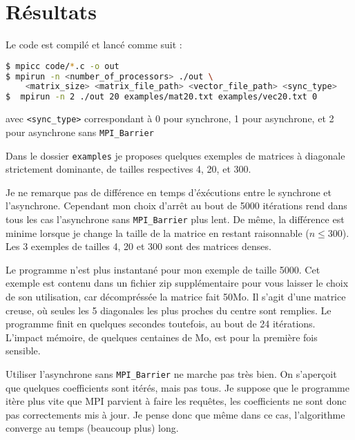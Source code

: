 \documentclass[11pt, a4paper]{article}
\begin{document}
\section{Résultats}

Le code est compilé et lancé comme suit :
\begin{lstlisting}[language=bash, keywordstyle=\color{black}\bf]
$ mpicc code/*.c -o out
$ mpirun -n <number_of_processors> ./out \
    <matrix_size> <matrix_file_path> <vector_file_path> <sync_type>
$  mpirun -n 2 ./out 20 examples/mat20.txt examples/vec20.txt 0
\end{lstlisting}

avec \lstinline{<sync_type>} correspondant à 0 pour synchrone, 1 pour asynchrone,
et 2 pour asynchrone sans \lstinline{MPI_Barrier}

\bigskip

Dans le dossier \texttt{examples} je proposes quelques exemples de matrices à diagonale strictement dominante, de tailles respectives 4, 20, et 300.

Je ne remarque pas de différence en temps d'éxécutions entre le synchrone et l'asynchrone. Cependant mon choix d'arrêt au bout de 5000 itérations rend dans tous les cas l'asynchrone sans \lstinline{MPI_Barrier} plus lent.
De même, la différence est minime lorsque je change la taille de la matrice en restant raisonnable (\(n \leq 300\)).
Les 3 exemples de tailles 4, 20 et 300 sont des matrices denses.

Le programme n'est plus instantané pour mon exemple de taille 5000.
Cet exemple est contenu dans un fichier zip supplémentaire pour vous laisser le choix de son utilisation, car décompréssée la matrice fait 50Mo.
Il s'agit d'une matrice creuse, où seules les 5 diagonales les plus proches du
centre sont remplies. Le programme finit en quelques secondes toutefois, au bout de 24 itérations.
L'impact mémoire, de quelques centaines de Mo, est pour la première fois sensible.

\bigskip

Utiliser l'asynchrone sans \lstinline{MPI_Barrier} ne marche pas très bien.
On s'aperçoit que quelques coefficients sont itérés, mais pas tous.
Je suppose que le programme itère plus vite que MPI parvient à faire les requêtes, les coefficients ne sont donc pas correctements mis à jour.
Je pense donc que même dans ce cas, l'algorithme converge au temps (beaucoup plus) long.
\end{document}
